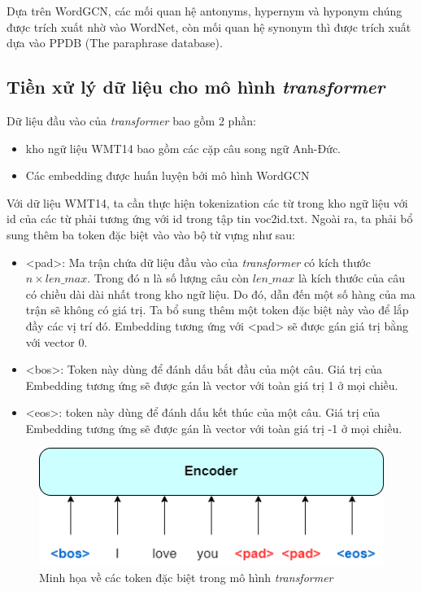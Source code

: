 {{{Dựa trên WordGCN, các mối quan hệ antonyms, hypernym và hyponym chúng được trích xuất nhờ vào WordNet, còn mối quan hệ synonym thì được trích xuất dựa vào PPDB (The paraphrase database).

\subsection{Tiền xử lý dữ liệu cho mô hình  \textit{transformer} }

Dữ liệu đầu vào của  \textit{transformer}  bao gồm 2 phần:
\begin{itemize}
	\item kho ngữ liệu WMT14 bao gồm các cặp câu song ngữ Anh-Đức.
	\item Các embedding được huấn luyện bởi mô hình WordGCN
\end{itemize}

Với dữ liệu WMT14, ta cần thực hiện tokenization các từ trong kho ngữ liệu với id của các từ phải tương ứng với id trong tập tin voc2id.txt. Ngoài ra, ta phải bổ sung thêm ba token đặc biệt vào vào bộ từ vựng như sau:
\begin{itemize}
	\item <pad>: Ma trận chứa dữ liệu đầu vào của  \textit{transformer}  có kích thước $n \times len\_max$. Trong đó n là số lượng câu còn $len\_max$ là kích thước của câu có chiều dài dài nhất trong kho ngữ liệu. Do đó, dẫn đến một số hàng của ma trận sẽ không có giá trị. Ta bổ sung thêm một token đặc biệt này vào để lắp đầy các vị trí đó. Embedding tương ứng với <pad> sẽ được gán giá trị bằng với vector 0.
	\item <bos>: Token này dùng để đánh dấu bắt đầu của một câu. Giá trị của Embedding tương ứng sẽ được gán là vector với toàn giá trị 1 ở mọi chiều.
	\item <eos>: token này dùng để đánh dấu kết thúc của một câu. Giá trị của Embedding tương ứng sẽ được gán là vector với toàn giá trị -1 ở mọi chiều.
\end{itemize}

\begin{figure}[H]
    \begin{center}
        \includegraphics[scale=0.85]{images/special-token}
        \caption{Minh họa về các token đặc biệt trong mô hình  \textit{transformer} }
        \label{fig:special token}
    \end{center}
\end{figure}

}}}
